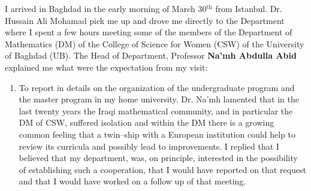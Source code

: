 \documentclass[12pt,a4paper]{scrartcl}
\begin{document}
I arrived in Baghdad in the early morning of March 30$^{\textrm{th}}$ from Istanbul. Dr. {Hussain Ali Mohamad} pick me up and drove me 
directly to the Department where I spent a few hours meeting some of the members of the Department of Mathematics (DM) of the 
College of Science for Women (CSW) of the University of Baghdad (UB). The Head of Department, Professor \textbf{Na'mh Abdulla Abid} 
explained me what were the expectation from my visit:
\begin{enumerate}
 \item To report in details on the organization of the undergraduate program and the master program in my home university. Dr. Na'mh lamented that
 in the last twenty years the Iraqi mathematical community, and in particular the DM of CSW, suffered isolation and within the DM there is a growing 
common feeling that a twin--ship
 with a European institution could help to review its curricula and possibly lead to improvements. I replied that I believed that my department, was, 
 on principle, interested in the possibility of establishing such a cooperation, that I would have reported on that request and that I would
 have worked on a follow up of that meeting. 


\end{enumerate}
\end{document}
